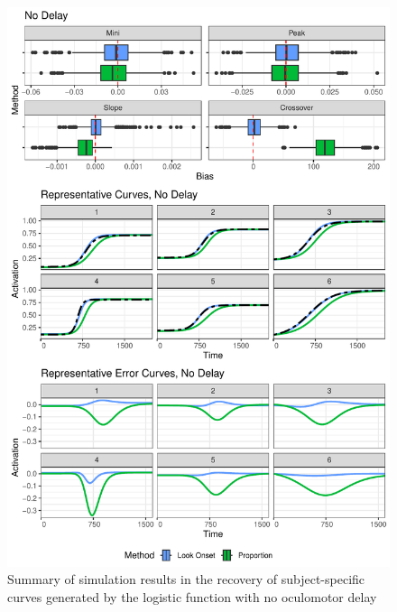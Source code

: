 \documentclass{article}
\begin{document}
\begin{figure}[H]
\centering
\includegraphics{rep_and_diff_no_delay.pdf}
\caption{Summary of simulation results in the recovery of subject-specific curves generated by the logistic function with no oculomotor delay}
\label{fig:panel_no_delay}
\end{figure}
\end{document}
